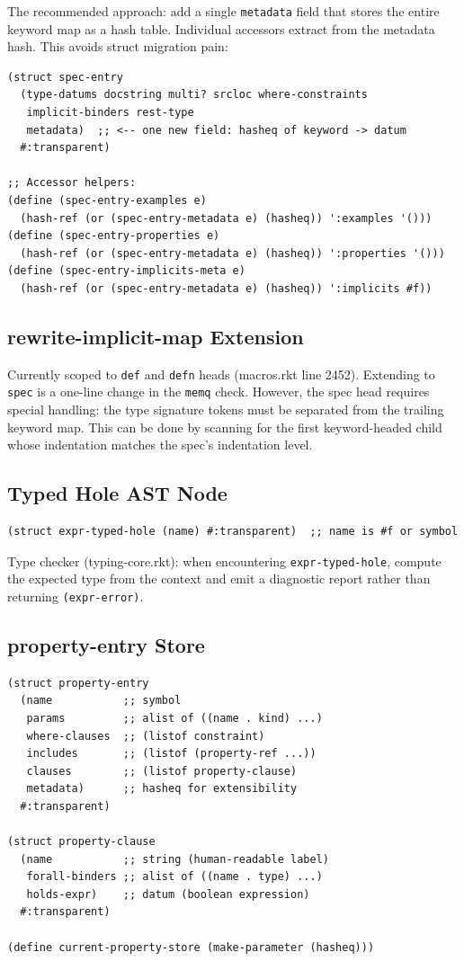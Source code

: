 \documentclass[11pt]{article}
\begin{document}
The recommended approach: add a single \texttt{metadata} field that stores the entire
keyword map as a hash table. Individual accessors extract from the metadata hash.
This avoids struct migration pain:

\begin{verbatim}
(struct spec-entry
  (type-datums docstring multi? srcloc where-constraints
   implicit-binders rest-type
   metadata)  ;; <-- one new field: hasheq of keyword -> datum
  #:transparent)

;; Accessor helpers:
(define (spec-entry-examples e)
  (hash-ref (or (spec-entry-metadata e) (hasheq)) ':examples '()))
(define (spec-entry-properties e)
  (hash-ref (or (spec-entry-metadata e) (hasheq)) ':properties '()))
(define (spec-entry-implicits-meta e)
  (hash-ref (or (spec-entry-metadata e) (hasheq)) ':implicits #f))
\end{verbatim}
\subsection{rewrite-implicit-map Extension}
\label{sec:orgd4ef215}

Currently scoped to \texttt{def} and \texttt{defn} heads (macros.rkt line 2452). Extending to
\texttt{spec} is a one-line change in the \texttt{memq} check. However, the spec head requires
special handling: the type signature tokens must be separated from the trailing
keyword map. This can be done by scanning for the first keyword-headed child
whose indentation matches the spec's indentation level.
\subsection{Typed Hole AST Node}
\label{sec:org4961345}

\begin{verbatim}
(struct expr-typed-hole (name) #:transparent)  ;; name is #f or symbol
\end{verbatim}

Type checker (typing-core.rkt): when encountering \texttt{expr-typed-hole}, compute
the expected type from the context and emit a diagnostic report rather than
returning \texttt{(expr-error)}.
\subsection{property-entry Store}
\label{sec:org40de4d9}

\begin{verbatim}
(struct property-entry
  (name           ;; symbol
   params         ;; alist of ((name . kind) ...)
   where-clauses  ;; (listof constraint)
   includes       ;; (listof (property-ref ...))
   clauses        ;; (listof property-clause)
   metadata)      ;; hasheq for extensibility
  #:transparent)

(struct property-clause
  (name           ;; string (human-readable label)
   forall-binders ;; alist of ((name . type) ...)
   holds-expr)    ;; datum (boolean expression)
  #:transparent)

(define current-property-store (make-parameter (hasheq)))
\end{verbatim}
\end{document}
